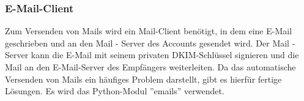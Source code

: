 \subsubsection{E-Mail-Client}
Zum Versenden von Mails wird ein Mail-Client benötigt, in dem eine E-Mail geschrieben und an den Mail - Server des Accounts gesendet wird. Der Mail - Server kann die E-Mail mit seinem privaten DKIM-Schlüssel signieren und die Mail an den E-Mail-Server des Empfängers weiterleiten. Da das automatische Versenden von Mails ein häufiges Problem darstellt, gibt es hierfür fertige Lösungen. Es wird das Python-Modul ''emails'' verwendet.

